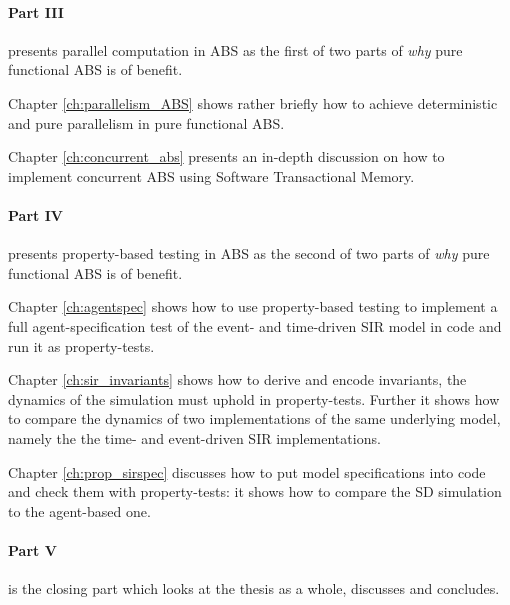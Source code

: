 \paragraph{Part III} presents parallel computation in ABS as the first of two parts of \textit{why} pure functional ABS is of benefit.
\medskip

Chapter \ref{ch:parallelism_ABS} shows rather briefly how to achieve deterministic and pure parallelism in pure functional ABS. 

\medskip

Chapter \ref{ch:concurrent_abs} presents an in-depth discussion on how to implement concurrent ABS using Software Transactional Memory.

\medskip

\paragraph{Part IV} presents property-based testing in ABS as the second of two parts of \textit{why} pure functional ABS is of benefit.
\medskip

Chapter \ref{ch:agentspec} shows how to use property-based testing to implement a full agent-specification test of the event- and time-driven SIR model in code and run it as property-tests.

\medskip

Chapter \ref{ch:sir_invariants} shows how to derive and encode invariants, the dynamics of the simulation must uphold in property-tests. Further it shows how to compare the dynamics of two implementations of the same underlying model, namely the the time- and event-driven SIR implementations.

\medskip

Chapter \ref{ch:prop_sirspec} discusses how to put model specifications into code and check them with property-tests: it shows how to compare the SD simulation to the agent-based one.

\medskip

\paragraph{Part V} is the closing part which looks at the thesis as a whole, discusses and concludes.
\medskip



